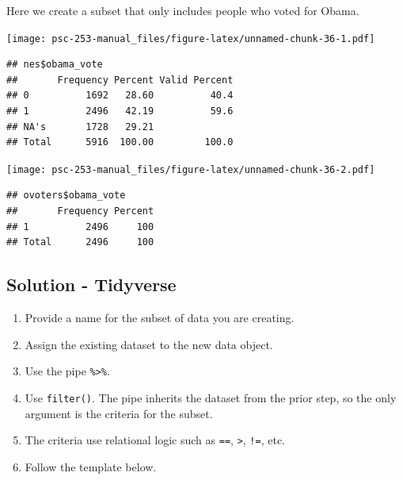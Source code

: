 \documentclass[
]{book}
\newenvironment{Shaded}{\begin{snugshade}}{\end{snugshade}}
\newcommand{\CommentTok}[1]{\textcolor[rgb]{0.56,0.35,0.01}{\textit{#1}}}
\newcommand{\DecValTok}[1]{\textcolor[rgb]{0.00,0.00,0.81}{#1}}
\newcommand{\FunctionTok}[1]{\textcolor[rgb]{0.00,0.00,0.00}{#1}}
\newcommand{\NormalTok}[1]{#1}
\newcommand{\OtherTok}[1]{\textcolor[rgb]{0.56,0.35,0.01}{#1}}
\newcommand{\SpecialCharTok}[1]{\textcolor[rgb]{0.00,0.00,0.00}{#1}}
\providecommand{\tightlist}{%
  \setlength{\itemsep}{0pt}\setlength{\parskip}{0pt}}
\begin{document}
Here we create a subset that only includes people who voted for Obama.

\begin{Shaded}
\end{Shaded}

\texttt{[image: psc-253-manual\_files/figure-latex/unnamed-chunk-36-1.pdf]}

\begin{verbatim}
## nes$obama_vote 
##       Frequency Percent Valid Percent
## 0          1692   28.60          40.4
## 1          2496   42.19          59.6
## NA's       1728   29.21              
## Total      5916  100.00         100.0
\end{verbatim}

\begin{Shaded}
\end{Shaded}

\texttt{[image: psc-253-manual\_files/figure-latex/unnamed-chunk-36-2.pdf]}

\begin{verbatim}
## ovoters$obama_vote 
##       Frequency Percent
## 1          2496     100
## Total      2496     100
\end{verbatim}

\hypertarget{solution---tidyverse}{%
\subsection{Solution - Tidyverse}\label{solution---tidyverse}}

\begin{enumerate}
\def\labelenumi{\arabic{enumi}.}
\tightlist
\item
  Provide a name for the subset of data you are creating.
\item
  Assign the existing dataset to the new data object.
\item
  Use the pipe \texttt{\%\textgreater{}\%}.
\item
  Use \texttt{filter()}. The pipe inherits the dataset from the prior step, so the only argument is the criteria for the subset.
\item
  The criteria use relational logic such as \texttt{==}, \texttt{\textgreater{}}, \texttt{!=}, etc.
\item
  Follow the template below.
\end{enumerate}
\end{document}
